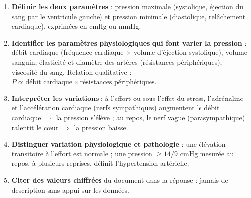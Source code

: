 \documentclass[11pt]{article}
\begin{document}
\begin{methode}
\begin{enumerate}
\item \textbf{Définir les deux paramètres} : pression maximale (systolique, éjection du sang par le ventricule gauche) et pression minimale (diastolique, relâchement cardiaque), exprimées en cmHg ou mmHg.
\item \textbf{Identifier les paramètres physiologiques qui font varier la pression} : débit cardiaque (fréquence cardiaque $\times$ volume d'éjection systolique), volume sanguin, élasticité et diamètre des artères (résistances périphériques), viscosité du sang. Relation qualitative : $P \propto \text{débit cardiaque} \times \text{résistances périphériques}$.
\item \textbf{Interpréter les variations} : à l'effort ou sous l'effet du stress, l'adrénaline et l'accélération cardiaque (nerfs sympathiques) augmentent le débit cardiaque $\Rightarrow$ la pression s'élève ; au repos, le nerf vague (parasympathique) ralentit le c\oe ur $\Rightarrow$ la pression baisse.
\item \textbf{Distinguer variation physiologique et pathologie} : une élévation transitoire à l'effort est normale ; une pression $\geq 14/9$ cmHg mesurée au repos, à plusieurs reprises, définit l'hypertension artérielle.
\item \textbf{Citer des valeurs chiffrées} du document dans la réponse : jamais de description sans appui sur les données.
\end{enumerate}
\end{methode}
\end{document}
